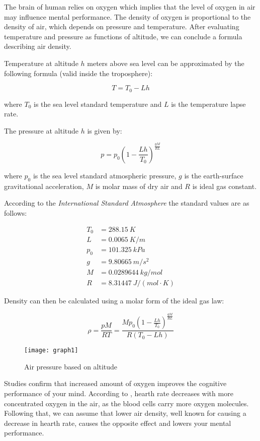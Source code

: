 
The brain of human relies on oxygen which implies that the level of oxygen in air may influence mental performance. The density of oxygen is proportional to the density of air, which depends on pressure and temperature. After evaluating temperature and pressure as functions of altitude, we can conclude a formula describing air density.

Temperature at altitude $h$ meters above sea level can be approximated by the following formula (valid inside the troposphere):

$$T=T_0-Lh$$

\noindent where $T_0$ is the sea level standard temperature and $L$ is the temperature lapse rate.

The pressure at altitude $h$ is given by:

$$p = p_0 \left(1-\frac{Lh}{T_0}\right)^\frac{gM}{RL}$$

\noindent where $p_0$ is the sea level standard atmospheric pressure, $g$ is the earth-surface gravitational acceleration, $M$ is molar mass of dry air and $R$ is ideal gas constant.

According to the \emph{International Standard Atmosphere} the standard values are as follows:

\begin{align*}
T_0 &= \SI{288.15}{K}\\
L &= \SI{0.0065}{K/m}\\
p_0 &= \SI{101.325}{kPa}\\
g &= \SI{9.80665}{m/s^2}\\
M &= \SI{0.0289644}{kg/mol}\\
R &= \SI{8.31447}{J/(mol\cdot K)}
\end{align*}

Density can then be calculated using a molar form of the ideal gas law:

$$\rho = \frac{pM}{RT} = \frac{M p_0 \left(1-\frac{Lh}{T_0}\right)^\frac{gM}{RL}  }{ R (T_0-Lh)  }$$
\begin{figure}[ht]
	\centering
		\texttt{[image: graph1]}
    \caption{Air pressure based on altitude}
\end{figure}


Studies \cite{Scholey1999,Chung2008,Chung2004} confirm that increased amount of oxygen improves the cognitive performance of your mind. According to \cite{Chung2008}, hearth rate decreases with more concentrated oxygen in the air, as the blood cells carry more oxygen molecules. Following that, we can assume that lower air density, well known for causing a decrease in hearth rate, causes the opposite effect and lowers your mental performance.

